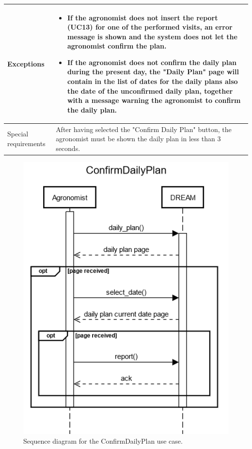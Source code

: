 \documentclass{article}
\begin{document}
\begin{longtable}{|p{3.5cm}|m{8cm}|}
 \hline
 Exceptions & \begin{itemize}
     \item If the agronomist does not insert the report (UC13) for one of the performed visits, an error message is shown and the system does not let the agronomist confirm the plan.
     \item If the agronomist does not confirm the daily plan during the present day, the "Daily Plan" page will contain in the list of dates for the daily plans also the date of the unconfirmed daily plan, together with a message warning the agronomist to confirm the daily plan.
 \end{itemize}\\
 
 \hline
 Special requirements & After having selected the "Confirm Daily Plan" button, the agronomist must be shown the daily plan in less than 3 seconds.\\
 \hline
\end{longtable}

\begin{figure}[H]
    \centering
    \includegraphics[scale=0.75]{sequence_diagrams/ConfirmDailyPlan.png}
    \caption{Sequence diagram for the ConfirmDailyPlan use case.}
\end{figure}
\end{document}
